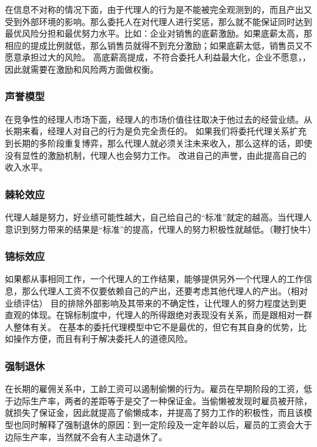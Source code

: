 \documentclass[12pt, a4paper]{article} %
\begin{document}
\begin{CJK*}{UTF8}{gbsn}
            在信息不对称的情况下面，由于代理人的行为是不能被完全观测到的，而且产出又受到外部环境的影响。那么委托人在对代理人进行奖惩，那么就不能保证同时达到
            最优风险分担和最优努力水平。比如：企业对销售的底薪激励。如果底薪太高，那相应的提成比例就低，那么销售员就得不到充分激励；如果底薪太低，销售员又不愿意承担过大的风险。
            高底薪高提成，不符合委托人利益最大化，企业不愿意，，因此就需要在激励和风险两方面做权衡。

            \subsubsection{声誉模型}
            在竞争性的经理人市场下面，经理人的市场价值往往取决于他过去的经营业绩。从长期来看，经理人对自己的行为是负完全责任的。
            如果我们将委托代理关系扩充到长期的多阶段重复博弈，那么代理人就必须关注未来收入，那么这样的话，即使没有显性的激励机制，代理人也会努力工作。
            改进自己的声誉，由此提高自己的收入水平。

            \subsubsection{棘轮效应}
            代理人越是努力，好业绩可能性越大，自己给自己的“标准”就定的越高。当代理人意识到努力带来的结果是“标准”的提高，代理人的努力积极性就越低。（鞭打快牛）

            \subsubsection{锦标效应}
            如果都从事相同工作，一个代理人的工作结果，能够提供另外一个代理人的工作信息，那么代理人工资不仅要依赖自己的产出，还要考虑其他代理人的产出。（相对业绩评估）
            目的排除外部影响及其带来的不确定性，让代理人的努力程度达到更直观的体现。在锦标制度中，代理人的所得跟绝对表现没有关系，而是跟相对一群人整体有关。
            在基本的委托代理模型中它不是最优的，但它有其自身的优势，比如操作方便，而且有利于解决委托人的道德风险。

            \subsubsection{强制退休}
            在长期的雇佣关系中，工龄工资可以遏制偷懒的行为。雇员在早期阶段的工资，低于边际生产率，两者的差距等于是交了一种保证金。当偷懒被发现时雇员被开除，
            就损失了保证金，因此就提高了偷懒成本，并提高了努力工作的积极性，而且该模型也同时解释了强制退休的原因：到一定阶段及一定年龄以后，雇员的工资会大于
            边际生产率，当然就不会有人主动退休了。


\end{CJK*}
\end{document}
